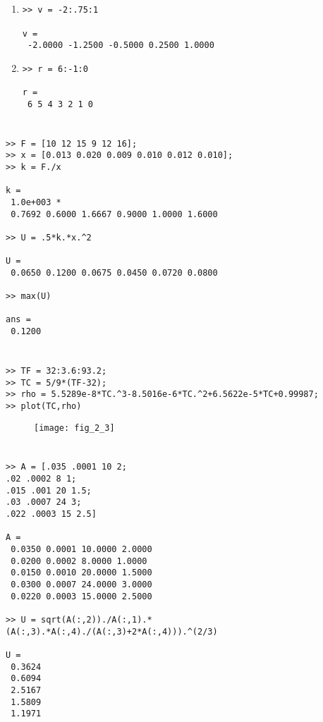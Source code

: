 \documentclass[../main.tex]{subfiles}
\begin{document}
\section{}
\begin{enumerate}[label=\bfseries(\alph*)]
\item
\begin{lstlisting}[numbers=none]
>> v = -2:.75:1

v =
 -2.0000 -1.2500 -0.5000 0.2500 1.0000 
\end{lstlisting}

\item
\begin{lstlisting}[numbers=none]
>> r = 6:-1:0

r =
 6 5 4 3 2 1 0 
\end{lstlisting}
\end{enumerate}
\section{}
\begin{lstlisting}[numbers=none]
>> F = [10 12 15 9 12 16];
>> x = [0.013 0.020 0.009 0.010 0.012 0.010];
>> k = F./x

k =
 1.0e+003 *
 0.7692 0.6000 1.6667 0.9000 1.0000 1.6000

>> U = .5*k.*x.^2

U =
 0.0650 0.1200 0.0675 0.0450 0.0720 0.0800

>> max(U)

ans =
 0.1200 
\end{lstlisting}
\bigbreak
\section{}
\begin{lstlisting}[numbers=none]
>> TF = 32:3.6:93.2;
>> TC = 5/9*(TF-32);
>> rho = 5.5289e-8*TC.^3-8.5016e-6*TC.^2+6.5622e-5*TC+0.99987;
>> plot(TC,rho) 
\end{lstlisting}
\begin{figure}[H]
		\texttt{[image: fig\_2\_3]}
		\label{fig:fig_2_ 3}
	\end{figure}
\section{}
\begin{lstlisting}[numbers=none]
>> A = [.035 .0001 10 2;
.02 .0002 8 1;
.015 .001 20 1.5;
.03 .0007 24 3;
.022 .0003 15 2.5]

A =
 0.0350 0.0001 10.0000 2.0000
 0.0200 0.0002 8.0000 1.0000
 0.0150 0.0010 20.0000 1.5000
 0.0300 0.0007 24.0000 3.0000
 0.0220 0.0003 15.0000 2.5000

>> U = sqrt(A(:,2))./A(:,1).*(A(:,3).*A(:,4)./(A(:,3)+2*A(:,4))).^(2/3)

U =
 0.3624
 0.6094
 2.5167
 1.5809
 1.1971
\end{lstlisting}
\bigbreak
\end{document}
